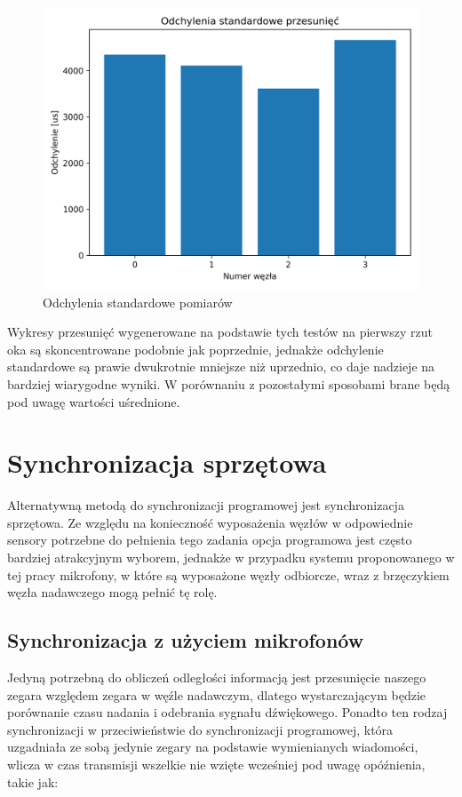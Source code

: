 \begin{figure}[H]
    \centering
    \includegraphics[width=.49\textwidth]{pics/time_deltas/stddev.png}
    \caption{Odchylenia standardowe pomiarów}
    \label{pic:stddev_deltas}
\end{figure}

Wykresy przesunięć wygenerowane na podstawie tych testów na pierwszy rzut oka są skoncentrowane podobnie jak poprzednie, jednakże odchylenie standardowe są prawie dwukrotnie mniejsze niż uprzednio, co daje nadzieje na bardziej wiarygodne wyniki. W porównaniu z pozostałymi sposobami brane będą pod uwagę wartości uśrednione.

\section{Synchronizacja sprzętowa}

Alternatywną metodą do synchronizacji programowej jest synchronizacja sprzętowa. Ze względu na konieczność wyposażenia węzłów w odpowiednie sensory potrzebne do pełnienia tego zadania opcja programowa jest często bardziej atrakcyjnym wyborem, jednakże w przypadku systemu proponowanego w tej pracy mikrofony, w które są wyposażone węzły odbiorcze, wraz z brzęczykiem węzła nadawczego mogą pełnić tę rolę.

\subsection{Synchronizacja z użyciem mikrofonów}\label{sec:mic_sync}

Jedyną potrzebną do obliczeń odległości informacją jest przesunięcie naszego zegara względem zegara w węźle nadawczym, dlatego wystarczającym będzie porównanie czasu nadania i odebrania sygnału dźwiękowego. Ponadto ten rodzaj synchronizacji w przeciwieństwie do synchronizacji programowej, która uzgadniała ze sobą jedynie zegary na podstawie wymienianych wiadomości, wlicza w czas transmisji wszelkie nie wzięte wcześniej pod uwagę opóźnienia, takie jak:

